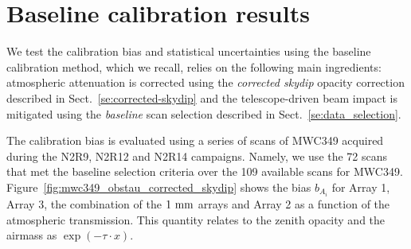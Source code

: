 

\section{Baseline calibration results}%
\label{se:photometry_baseline}

We test the calibration bias and statistical uncertainties using the
baseline calibration method, which we recall, relies on the following
main ingredients: atmospheric attenuation is corrected using
the \emph{corrected skydip} opacity correction described in
Sect.~\ref{se:corrected-skydip}
and the telescope-driven beam impact is mitigated using the
\emph{baseline} scan selection described in
Sect.~\ref{se:data_selection}.

The calibration bias is evaluated using a series of scans of MWC349
acquired during the N2R9, N2R12 and N2R14 campaigns. Namely, we use
the 72 scans that met the baseline selection criteria over the 109
available scans for MWC349.
Figure~\ref{fig:mwc349_obstau_corrected_skydip} shows the
bias $b_{A_i}$ for Array 1, Array 3, the combination of the $1~\rm{mm}$ arrays and
Array 2 as a function of the atmospheric transmission. This quantity
relates to the zenith opacity and the airmass as
$\exp \left( - \tau \cdot x \right) $.


